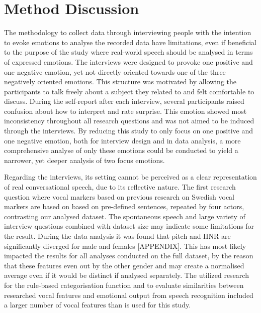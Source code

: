 \section{Method Discussion}

The methodology to collect data through interviewing people with the intention to evoke emotions to analyse the recorded data have limitations, even if beneficial to the purpose of the study where real-world speech should be analysed in terms of expressed emotions. The interviews were designed to provoke one positive and one negative emotion, yet not directly oriented towards one of the three negatively oriented emotions. This structure was motivated by allowing the participants to talk freely about a subject they related to and felt comfortable to discuss. During the self-report after each interview, several participants raised confusion about how to interpret and rate surprise. This emotion showed most inconsistency throughout all research questions and was not aimed to be induced through the interviews. By reducing this study to only focus on one positive and one negative emotion, both for interview design and in data analysis, a more comprehensive analyse of only these emotions could be conducted to yield a narrower, yet deeper analysis of two focus emotions. 

\medskip
Regarding the interviews, its setting cannot be perceived as a clear representation of real conversational speech, due to its reflective nature. The first research question where vocal markers based on previous research on Swedish vocal markers are based on based on pre-defined sentences, repeated by four actors, contrasting our analysed dataset. The spontaneous speech and large variety of interview questions combined with dataset size may indicate some limitations for the result. During the data analysis it was found that pitch and HNR are significantly diverged for male and females [APPENDIX]. This has most likely impacted the results for all analyses conducted on the full dataset, by the reason that these features even out by the other gender and may create a normalised average even if it would be distinct if analysed separately. The utilized research for the rule-based categorisation function and to evaluate similarities between researched vocal features and emotional output from speech recognition included a larger number of vocal features than is used for this study. 

